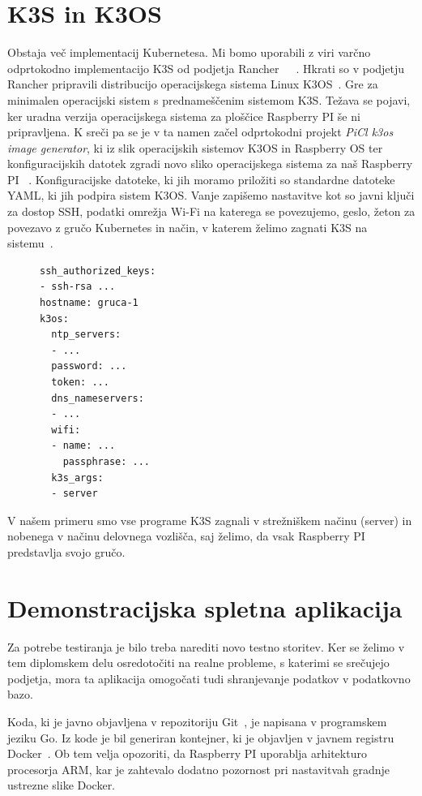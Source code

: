 \documentclass[a4paper, 12pt]{book}
\begin{document}
\section{K3S in K3OS}
Obstaja več implementacij Kubernetesa.
Mi bomo uporabili z viri varčno odprtokodno implementacijo K3S od podjetja Rancher~\cite{k3s-info}~\cite{k8s-performance-comparison}~\cite{low-resource-k8s}.
Hkrati so v podjetju Rancher pripravili distribucijo operacijskega sistema Linux K3OS~\cite{k3os-git}.
Gre za minimalen operacijski sistem s prednameščenim sistemom K3S.
Te\-ža\-va se pojavi, ker uradna verzija operacijskega sistema za ploščice Raspberry PI še ni pripravljena.
K sreči pa se je v ta namen začel odprtokodni projekt \emph{PiCl k3os image generator}, ki iz slik operacijskih sistemov K3OS in Raspberry OS ter konfiguracijskih datotek zgradi novo sliko operacijskega sistema za naš Raspberry PI ~\cite{k3os-rpi-image-generator}.
Konfiguracijske datoteke, ki jih moramo priložiti so standardne datoteke YAML, ki jih podpira sistem K3OS.
Vanje zapišemo nastavitve kot so javni ključi za dostop SSH, podatki omrežja Wi-Fi na katerega se povezujemo, geslo, žeton za povezavo z gručo Kubernetes in način, v katerem želimo zagnati K3S na sistemu~\cite{k3os-git}.
\begin{figure}[h]
  \begin{verbatim}
ssh_authorized_keys:
- ssh-rsa ...
hostname: gruca-1
k3os:
  ntp_servers:
  - ...
  password: ...
  token: ...
  dns_nameservers:
  - ... 
  wifi:
  - name: ...
    passphrase: ...
  k3s_args:
  - server
\end{verbatim}
\end{figure}

V našem primeru smo vse programe K3S zagnali v strežniškem načinu (server) in nobenega v načinu delovnega vozlišča, saj želimo, da vsak Raspberry PI predstavlja svojo gručo.
\section{Demonstracijska spletna aplikacija}
Za potrebe testiranja je bilo treba narediti novo testno storitev.
Ker se želimo v tem diplomskem delu osredotočiti na realne probleme, s katerimi se srečujejo podjetja, mora ta aplikacija omogočati tudi shranjevanje podatkov v podatkovno bazo.

Koda, ki je javno objavljena v repozitoriju Git~\cite{git-stateful-rest-sample}, je napisana v programskem jeziku Go.
Iz kode je bil generiran kontejner, ki je objavljen v javnem registru Docker~\cite{docker-stateful-rest-sample}.
Ob tem velja opozoriti, da Raspberry PI uporablja arhitekturo procesorja ARM, kar je zahtevalo dodatno pozornost pri nastavitvah gradnje ustrezne slike Docker.
\end{document}
